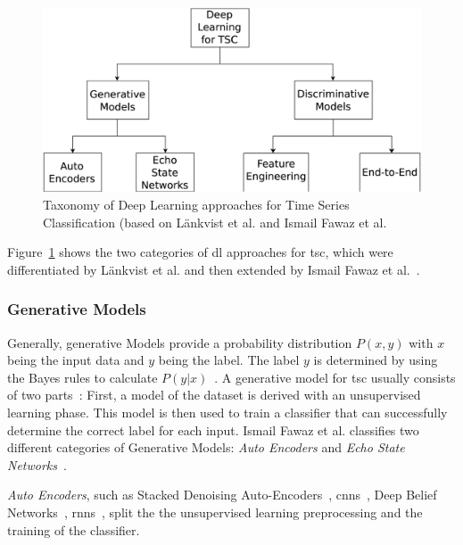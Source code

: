 \begin{figure}
    \center
    \includegraphics[width=\columnwidth]{fig/deep_learning_approaches.pdf}
    \caption{Taxonomy of Deep Learning approaches for Time Series Classification (based on L\"ankvist et al. and Ismail Fawaz et al.~\cite{langkvist2014review,ismail2019deep}}
    \label{fig:deep_learning_approaches}
\end{figure}

Figure~\ref{fig:deep_learning_approaches} shows the two categories of \ac{dl} approaches for \ac{tsc}, which were differentiated by L\"ankvist et al. and then extended by Ismail Fawaz et al.~\cite{langkvist2014review,ismail2019deep}.

\subsubsection*{Generative Models}
Generally, generative Models provide a probability distribution $P(x,y)$ with $x$ being the input data and $y$ being the label.
The label $y$ is determined by using the Bayes rules to calculate $P(y|x)$~\cite{ng2001discriminative}.
A generative model for \ac{tsc} usually consists of two parts~\cite{langkvist2014review}: First, a model of the dataset is derived with an unsupervised learning phase.
This model is then used to train a classifier that can successfully determine the correct label for each input.
Ismail Fawaz et al. classifies two different categories of Generative Models: \textit{Auto Encoders} and \textit{Echo State Networks}~\cite{ismail2019deep}.

\textit{Auto Encoders}, such as Stacked Denoising Auto-Encoders~\cite{bengio2013generalized}, \acp{cnn}~\cite{song2020representation}, Deep Belief Networks~\cite{banerjee2019deep}, \acp{rnn}~\cite{rajan2018generative}, split the the unsupervised learning preprocessing
and the training of the classifier.

